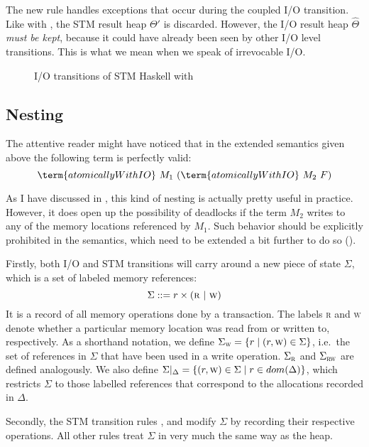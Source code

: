 The new rule  handles exceptions that occur during the coupled I/O transition.
Like with , the STM result heap $\Theta'$ is discarded.
However, the I/O result heap $\hat{\Theta}$ \emph{must be kept}, because it could have already been seen by other I/O level transitions.
This is what we mean when we speak of irrevocable I/O.

\begin{figure}[!h]

\caption{I/O transitions of STM Haskell with }
\label{fig:step1-io}
\end{figure}

\clearpage


\subsection{Nesting}

The attentive reader might have noticed that in the extended semantics given above the following term is perfectly valid:
$$
\term{atomicallyWithIO}\ M_1\ (\term{atomicallyWithIO}\ M_2\ F)
$$

As I have discussed in , this kind of nesting is actually pretty useful in practice.
However, it does open up the possibility of deadlocks if the term $M_2$ writes to any of the memory locations referenced by $M_1$.
Such behavior should be explicitly prohibited in the semantics, which need to be extended a bit further to do so ().

Firstly, both I/O and STM transitions will carry around a new piece of state $\Sigma$, which is a set of labeled memory references:
$$
\Sigma ::= r \times (\textsc{r}\ \vert\ \textsc{w})
$$
It is a record of all memory operations done by a transaction.
The labels \textsc{r} and \textsc{w} denote whether a particular memory location was read from or written to, respectively.
As a shorthand notation, we define $\Sigma_\textsc{w}=\{r \mid (r,\textsc{w}) \in \Sigma\}$, i.e.\ the set of references in $\Sigma$ that have been used in a write operation.
$\Sigma_\textsc{r}$ and $\Sigma_\textsc{rw}$ are defined analogously.
We also define $\Sigma\vert_\Delta=\{ (r,\textsc{w}) \in \Sigma \mid r \in dom(\Delta)\}$, which restricts $\Sigma$ to those labelled references that correspond to the allocations recorded in $\Delta$.

Secondly, the STM transition rules ,  and  modify $\Sigma$ by recording their respective operations.
All other rules treat $\Sigma$ in very much the same way as the heap.

